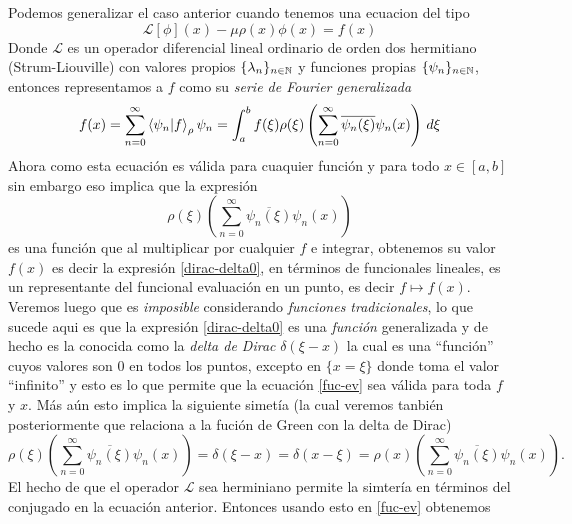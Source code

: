 \documentclass[main.tex]{subfiles}
\begin{document}
\obs Podemos generalizar el caso anterior cuando tenemos una ecuacion del tipo
\begin{equation}\label{eq-ord2}
  \mathcal{L}[\phi](x)-\mu\rho(x)\phi(x)=f(x)
\end{equation}
Donde $\mathcal{L}$ es un operador diferencial lineal ordinario de orden dos hermitiano (Strum-Liouville) con valores propios $\{\lambda_{n}\}_{n\in \mathbb N }$ y funciones propias $\{\psi_{n}\}_{n\in \mathbb N }$, entonces representamos a $f$ como su \emph{serie de Fourier generalizada}
\begin{equation}\label{fuc-ev}  f(x)=\sum_{n=0}^{\infty}\braket{\psi_{n}|f}_{\rho}\psi_{n}=\int_{a}^{b}f(\xi)\rho(\xi)\left(\sum_{n=0}^{\infty}\overline{\psi_{n}(\xi)}\psi_{n}(x)\right)\,d\xi
\end{equation}
Ahora como esta ecuación es válida para cuaquier función y para todo $x\in[a,b]$ sin embargo eso implica que la expresión
\begin{equation}\label{dirac-delta0}
  \rho(\xi)\left(\sum_{n=0}^{\infty}\overline{\psi_{n}(\xi)}\psi_{n}(x)\right)
\end{equation}
es una función que al multiplicar por cualquier $f$ e integrar, obtenemos su valor $f(x)$ es decir la expresión \ref{dirac-delta0}, en términos de funcionales lineales, es un representante del funcional evaluación en un punto, es decir $f\mapsto f(x)$. Veremos luego que es \emph{imposible} considerando \emph{funciones tradicionales}, lo que sucede aqui es que la expresión \ref{dirac-delta0} es una \emph{función} generalizada y de hecho es la conocida como la \emph{delta de Dirac} $\delta(\xi-x)$ la cual es una ``función'' cuyos valores son $0$ en todos los puntos, excepto en $\{x=\xi\}$ donde toma el valor ``infinito'' y esto es lo que permite que la ecuación \ref{fuc-ev} sea válida para toda $f$ y $x$. Más aún esto implica la siguiente simetía (la cual veremos tanbién posteriormente que relaciona a la fución de Green con la delta de Dirac)
\[
  \rho(\xi)\left(\sum_{n=0}^{\infty}\overline{\psi_{n}(\xi)}\psi_{n}(x)\right)=\delta(\xi-x)=\delta(x-\xi)=  \rho(x)\left(\sum_{n=0}^{\infty}\overline{\psi_{n}(\xi)}\psi_{n}(x)\right).
\]
El hecho de que el operador $\mathcal{L}$ sea herminiano permite la simtería en términos del conjugado en la ecuación anterior. Entonces usando esto en \ref{fuc-ev} obtenemos
\end{document}
